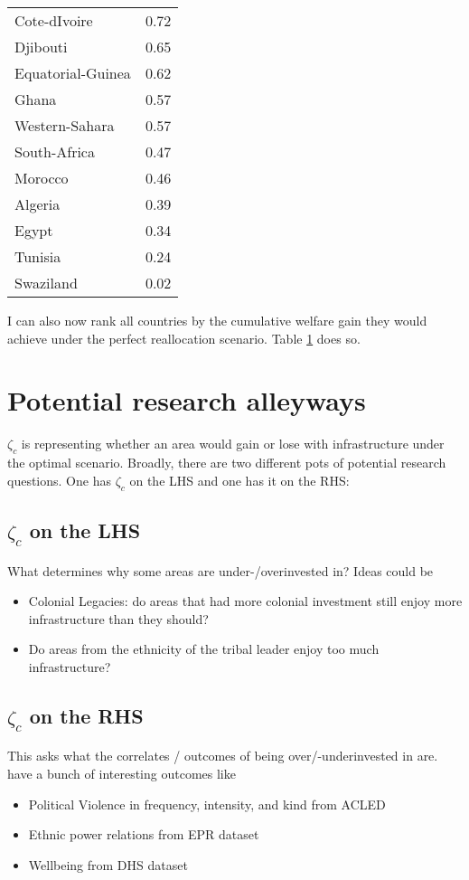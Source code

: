 \documentclass[11pt, oneside]{article}   	%
\begin{document}
\begin{table}[ht]
\begin{tabular}{lr}
  Cote-dIvoire & 0.72 \\
  Djibouti & 0.65 \\
  Equatorial-Guinea & 0.62 \\
  Ghana & 0.57 \\
  Western-Sahara & 0.57 \\
  South-Africa & 0.47 \\
  Morocco & 0.46 \\
  Algeria & 0.39 \\
  Egypt & 0.34 \\
  Tunisia & 0.24 \\
  Swaziland & 0.02 \\
   \hline
\end{tabular}
  \label{tab:national_zeta}
  \end{table}




I can also now rank all countries by the cumulative welfare gain they would achieve under the perfect reallocation scenario. Table \ref{tab:national_zeta} does so.

\section{Potential research alleyways}
$\zeta_{c}$ is representing whether an area would gain or lose with infrastructure under the optimal scenario. Broadly, there are two different pots of potential research questions. One has $\zeta_{c}$ on the LHS and one has it on the RHS:

\subsection{$\zeta_{c}$ on the LHS}
What determines why some areas are under-/overinvested in? Ideas could be
\begin{itemize}
  \item Colonial Legacies: do areas that had more colonial investment still enjoy more infrastructure than they should?
  \item Do areas from the ethnicity of the tribal leader enjoy too much infrastructure?
\end{itemize}

\subsection{$\zeta_{c}$ on the RHS}
This asks what the correlates / outcomes of being over/-underinvested in are. \cite{michalopoulos_long-run_2016} have a bunch of interesting outcomes like
\begin{itemize}
  \item Political Violence in frequency, intensity, and kind from ACLED
  \item Ethnic power relations from EPR dataset
  \item Wellbeing from DHS dataset
\end{itemize}
\end{document}
